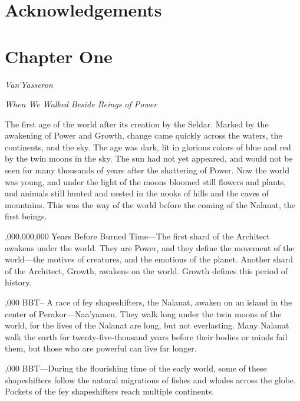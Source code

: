 \documentclass[smalldemyvopaper,11pt,twoside,onecolumn,openright,extrafontsizes]{memoir}
\begin{document}
{{\chapter*{Acknowledgements}
\clearpage
\tableofcontents*

\mainmatter
\chapter{Chapter One}

\textit{Van'Yasseron}

\textit{When We Walked Beside Beings of Power}


\par\vfill The first age of the world after its creation by the Seldar. Marked by the awakening of Power and Growth, change came quickly across the waters, the continents, and the sky. The age was dark, lit in glorious colors of blue and red by the twin moons in the sky. The sun had not yet appeared, and would not be seen for many thousands of years after the shattering of Power. Now the world was young, and under the light of the moons bloomed still flowers and plants, and animals still hunted and nested in the nooks of hills and the caves of mountains. This was the way of the world before the coming of the Nalanat, the first beings.

\par\vfill{},000,000,000 Years Before Burned Time—The first shard of the Architect awakens under the world. They are Power, and they define the movement of the world—the motives of creatures, and the emotions of the planet. Another shard of the Architect, Growth, awakens on the world. Growth defines this period of history.

\par\vfill{},000 BBT-- A race of fey shapeshifters, the Nalanat, awaken on an island in the center of Perakor—Naa'yamen. They walk long under the twin moons of the world, for the lives of the Nalanat are long, but not everlasting. Many Nalanat walk the earth for twenty-five-thousand years before their bodies or minds fail them, but those who are powerful can live far longer.

\par\vfill{},000 BBT—During the flourishing time of the early world, some of these shapeshifters follow the natural migrations of fishes and whales across the globe. Pockets of the fey shapeshifters reach multiple continents.

}}
\end{document}
